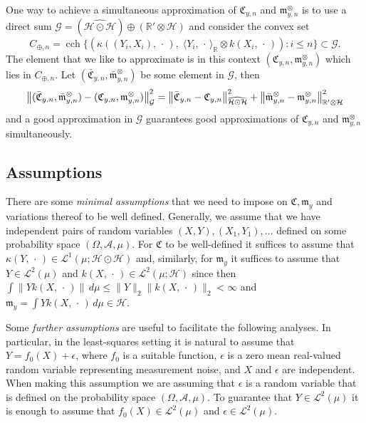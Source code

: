 \documentclass[AHL,Unicode,longabstracts,published]{cedram}
\theoremstyle{remark}
\DeclareMathOperator{\cch}{cch}
\newcommand{\R}{\mathbb{R}}
\newcommand{\dR}{{\R'}}
\newcommand{\clA}{\mathcal{A}}
\newcommand{\cH}{\mathcal{H}}
\newcommand{\clL}{\mathcal{L}}
\newcommand{\clG}{\mathcal{G}}
\newcommand{\fkC}{\mathfrak{C}}
\newcommand{\mean}{\mathfrak{m}}
\newcommand{\bn}{\bm{\|}}
\let\originalleft\left
\let\originalright\right
\renewcommand{\left}{\mathopen{}\mathclose\bgroup\originalleft}
\renewcommand{\right}{\aftergroup\egroup\originalright}
\begin{document}
One way to achieve a simultaneous approximation of $\fkC_{y,n}$ and $\mean_{y,n}^\otimes$ is to use a direct sum $\clG = (\widehat{\cH \odot \cH}) \oplus (\dR \otimes \cH)$ and consider the convex set
\[
C_{\oplus,n} = \cch \bigl\{ (\kappa((Y_i,X_i),\,\cdot\,), \;\langle Y_i,\,\cdot\, \rangle_\R \otimes k(X_i, \,\cdot\,)) : i \leq n \bigr\}\subset \clG.
\]
The element that we like to approximate is in this context $(\fkC_{y,n}, \mean^\otimes_{y,n})$ which lies in $C_{\oplus,n}$. Let $(\bar{\fkC}_{y,n}, \bar{\mean}_{y,n}^\otimes)$ be some element in $\clG$, then
\begin{align*}
\left\| (\bar{\fkC}_{y,n}, \bar{\mean}_{y,n}^\otimes) - (\fkC_{y,n}, \mean_{y,n}^\otimes) \right\|_{\clG}^2 =
\left\| \bar{\fkC}_{y,n} - \fkC_{y,n} \right\|_{\widehat{\cH \odot \cH}}^2 + \left\| \bar{\mean}^\otimes_{y,n} - \mean_{y,n}^\otimes \right\|_{\dR \otimes \cH}^2
\end{align*}
and a good approximation in $\clG$ guarantees good approximations of $\fkC_{y,n}$ and $\mean_{y,n}^\otimes$ simultaneously.



\subsection{Assumptions} There are some \emph{minimal assumptions} that we need to impose on $\fkC, \mean_y$ and variations thereof to be well defined. Generally, we assume that we have independent pairs of random variables $(X,Y),(X_1,Y_1), \dots$ defined on some probability space $(\Omega,\clA,\mu)$. For $\fkC$ to be well-defined it suffices to assume that $\kappa(Y,\,\cdot\,) \in \clL^1(\mu;\cH \odot \cH)$ and, similarly, for $\mean_y$ it suffices to assume that $Y \in \clL^2(\mu)$ and $k(X,\,\cdot\,) \in \clL^2(\mu;\cH)$ since then $\int \| Y k(X,\,\cdot\,) \| \, d\mu \leq \|Y\|_2 \bn k(X,\,\cdot\,)\bn_2 < \infty$ and $\mean_y = \int Y k(X,\,\cdot\,) \, d\mu \in \cH$.

Some \emph{further assumptions} are useful to facilitate the following analyses. In particular, in the least-squares setting it is natural to assume that $Y = f_0(X) + \epsilon$, where $f_0$ is a suitable function, $\epsilon$ is a zero mean real-valued random variable representing measurement noise, and $X$ and $\epsilon$ are independent. When making this assumption we are assuming that $\epsilon$ is a random variable that is defined on the probability space $(\Omega,\clA,\mu)$. To guarantee that $Y \in \clL^2(\mu)$ it is enough to assume that $f_0(X) \in \clL^2(\mu)$ and $\epsilon \in \clL^2(\mu)$.
\end{document}
